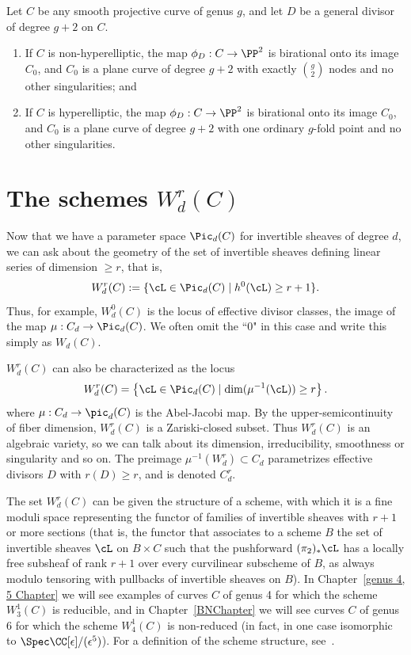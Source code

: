 \begin{theorem}[$g+2$ theorem]\label{g+2 theorem}
Let $C$ be any smooth projective curve of genus $g$, and let $D$ be a general divisor of degree $g+2$ on $C$. 
\begin{enumerate}
\item If $C$ is non-hyperelliptic, the map $\phi_D : C \to \PP^2$ is birational onto its image $C_0$, and $C_0$ is a plane curve of degree $g+2$ with exactly $\binom{g}{2}$ nodes and no other singularities; and
\item If $C$ is hyperelliptic, the map $\phi_D : C \to \PP^2$ is birational onto its image $C_0$, and $C_0$ is a plane curve of degree $g+2$ with one ordinary $g$-fold point and no other singularities.
\end{enumerate}
\end{theorem}



\section{The schemes $W^r_d(C)$}

Now that we have a parameter space $\Pic_d(C)$ for invertible sheaves of degree $d$, we can ask about the geometry of the set of invertible sheaves defining linear series of dimension $\geq r$, that is,
$$
W^r_d(C) := \{ \cL \in \Pic_d(C) \mid h^0(\cL) \geq r+1 \}.
$$
Thus, for example, $W^0_d(C)$ is the locus of effective divisor classes, the image of the map $\mu : C_d \to \Pic_d(C)$. We often omit the ``0" in this case and write this simply as $W_d(C)$.

$W^r_d(C)$ can also be characterized as the locus
$$
W^r_d(C) = \left\{ \cL \in \Pic_d(C) \mid \dim(\mu^{-1}(\cL)) \geq r \right\}.
$$
where $\mu : C_d \to \pic_d(C)$ is the Abel-Jacobi map. By the upper-semicontinuity of fiber dimension, $W^r_d(C)$ is a Zariski-closed subset.
Thus $W^r_d(C)$ is an algebraic variety, so we can talk about its dimension, irreducibility, smoothness or singularity and so on. The preimage $\mu^{-1}(W^r_d) \subset C_d$ parametrizes effective divisors $D$ with $r(D) \geq r$, and is denoted $C^r_d$.

The set $W^r_d(C)$ can be given the structure of a scheme, with which it is a fine moduli space representing the functor of families of invertible sheaves with $r+1$ or more sections (that is, the functor that associates to a scheme $B$ the set of invertible sheaves $\cL$ on $B \times C$ such that the pushforward $(\pi_2)_*\cL$ has a locally free subsheaf of rank $r+1$ over every curvilinear subscheme of $B$, as always modulo tensoring with pullbacks of invertible sheaves on $B$). In Chapter~\ref{genus 4, 5 Chapter} we will see examples of curves $C$ of genus 4 for which the scheme $W^1_3(C)$ is reducible, and in Chapter~\ref{BNChapter} we will see curves $C$ of genus 6 for which the scheme $W^1_4(C)$ is non-reduced (in fact, in one case  isomorphic to $\Spec \CC[\epsilon]/(\epsilon^5)$). For a definition of the scheme structure, see~\cite[Section IV.3]{ACGH}. 

